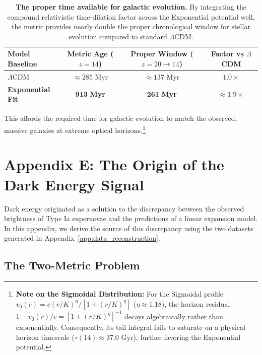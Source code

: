 \documentclass[11pt]{article}
\begin{document}
\begin{table}[h]
    \centering
    \begin{tabular}{|l|c|c|c|}
        \hline
        \textbf{Model Baseline} & \textbf{Metric Age ($z=14$)} & \textbf{Proper Window ($z=20 \to 14$)} & \textbf{Factor vs $\Lambda$CDM} \\
        \hline
        $\Lambda$CDM & $\approx 285$ Myr & $\approx 137$ Myr & $1.0\times$ \\
        \textbf{Exponential Fit} & $\mathbf{913}$ \textbf{Myr} & $\mathbf{261}$ \textbf{Myr} & $\mathbf{\approx 1.9\times}$ \\
        \hline
    \end{tabular}
    \caption{\textbf{The proper time available for galactic evolution.} By integrating the compound relativistic time-dilation factor across the Exponential potential well, the metric provides nearly double the proper chronological window for stellar evolution compared to standard $\Lambda$CDM.}
    \label{tab:time_window}
\end{table}

This affords the required time for galactic evolution to match the observed, massive galaxies at extreme optical horizons.\footnote{\textbf{Note on the Sigmoidal Distribution:} For the Sigmoidal profile $v_0(r) = c (r/K)^\eta / [1 + (r/K)^\eta]$ ($\eta \approx 1.18$), the horizon residual $1 - v_0(r)/c = [1 + (r/K)^\eta]^{-1}$ decays algebraically rather than exponentially. Consequently, its tail integral fails to saturate on a physical horizon timescale ($\tau(14) \approx 37.0\text{ Gyr}$), further favoring the Exponential potential.}

\section{Appendix E: The Origin of the Dark Energy Signal}
\label{app:dark_energy_origin}

Dark energy originated as a solution to the discrepancy between the observed brightness of Type Ia supernovae and the predictions of a linear expansion model. In this appendix, we derive the source of this discrepancy using the two datasets generated in Appendix~\ref{app:data_reconstruction}.

\subsection{The Two-Metric Problem}
\end{document}
